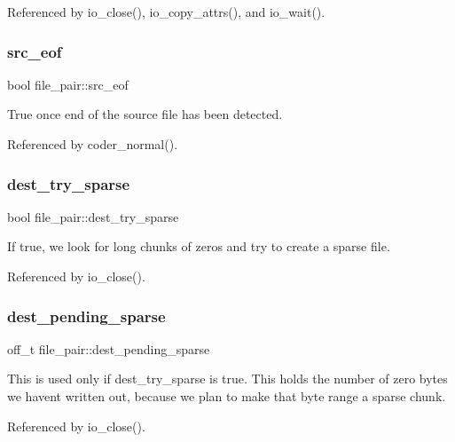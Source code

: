 Referenced by io\+\_\+close(), io\+\_\+copy\+\_\+attrs(), and io\+\_\+wait().

\mbox{\label{structfile__pair_afee08cdab4c8f19e0734a6da48e21921}} 
\subsubsection{src\+\_\+eof}
{\footnotesize\ttfamily bool file\+\_\+pair\+::src\+\_\+eof}



True once end of the source file has been detected. 



Referenced by coder\+\_\+normal().

\mbox{\label{structfile__pair_a0267a1a379d041c2c4dbf6db1035a20c}} 
\subsubsection{dest\+\_\+try\+\_\+sparse}
{\footnotesize\ttfamily bool file\+\_\+pair\+::dest\+\_\+try\+\_\+sparse}

If true, we look for long chunks of zeros and try to create a sparse file. 

Referenced by io\+\_\+close().

\mbox{\label{structfile__pair_a8372ad2043ad566b72c2743bd42bbe22}} 
\subsubsection{dest\+\_\+pending\+\_\+sparse}
{\footnotesize\ttfamily off\+\_\+t file\+\_\+pair\+::dest\+\_\+pending\+\_\+sparse}

This is used only if dest\+\_\+try\+\_\+sparse is true. This holds the number of zero bytes we haven\textquotesingle{}t written out, because we plan to make that byte range a sparse chunk. 

Referenced by io\+\_\+close().

\mbox{\label{structfile__pair_ab2b63e4c15c0489b67ee3d795174d3dc}} 
